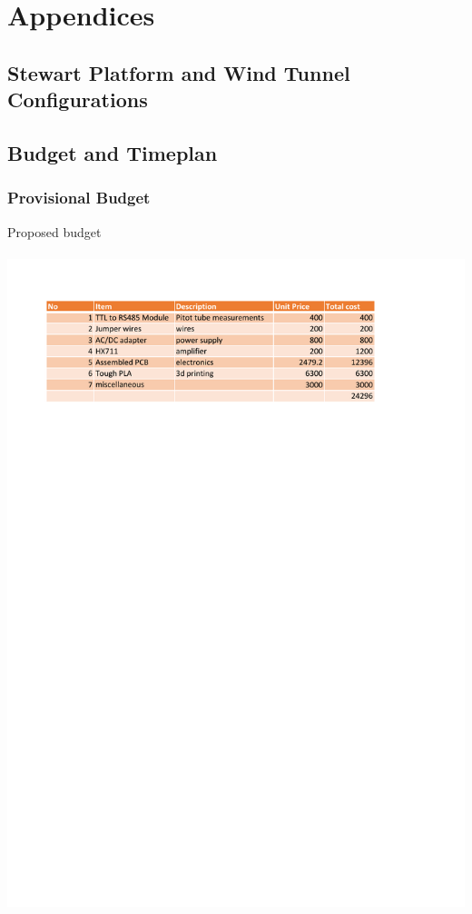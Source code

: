 \appendix
\section{Appendices}
 \subsection{Stewart Platform and Wind Tunnel Configurations}
 
 
 \subsection{Budget and Timeplan}
 \subsubsection{Provisional Budget}
 \begin{center}
 \begin{table}[!h]
 \centering
 \caption{Proposed budget}
 \paragraph{ }
 \includegraphics{Figures/budget}
 \end{table}
 \end{center}
